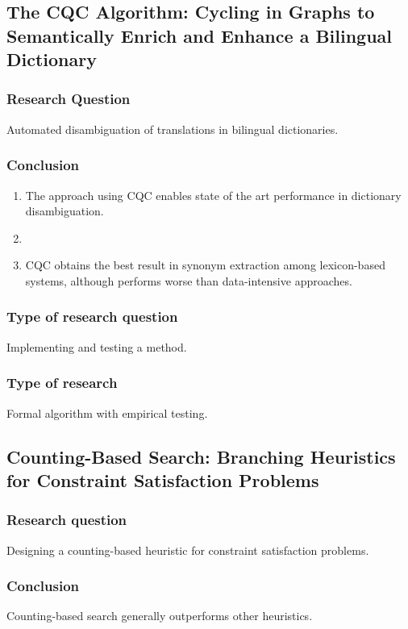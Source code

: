 \documentclass[a4paper, 10pt]{article}
\begin{document}
\subsection{The CQC Algorithm: Cycling in Graphs to Semantically Enrich and Enhance a Bilingual Dictionary}
\subsubsection*{Research Question}
Automated disambiguation of translations in bilingual dictionaries.

\subsubsection*{Conclusion}

\begin{enumerate}
  \item The approach using CQC enables state of the art performance
    in dictionary disambiguation.
  \item 
  \item CQC obtains the best result in synonym extraction among lexicon-based
    systems, although performs worse than data-intensive approaches.
\end{enumerate}

\subsubsection*{Type of research question}
Implementing and testing a method.

\subsubsection*{Type of research}
Formal algorithm with empirical testing.

\subsection{Counting-Based Search: Branching Heuristics for Constraint Satisfaction Problems}
\subsubsection*{Research question}
Designing a counting-based heuristic for constraint satisfaction problems.
\subsubsection*{Conclusion}
Counting-based search generally outperforms other heuristics.
\end{document}
